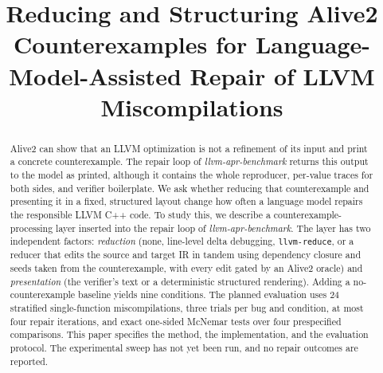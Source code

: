 \documentclass[conference]{IEEEtran}
\begin{document}
\title{Reducing and Structuring Alive2 Counterexamples for Language-Model-Assisted Repair of LLVM Miscompilations}

\author{%
\and
{}
\and
{}
\and
{}
}

\maketitle

\begin{abstract}
Alive2 can show that an LLVM optimization is not a refinement of its input and print a concrete counterexample. The repair loop of \emph{llvm-apr-benchmark} returns this output to the model as printed, although it contains the whole reproducer, per-value traces for both sides, and verifier boilerplate. We ask whether reducing that counterexample and presenting it in a fixed, structured layout change how often a language model repairs the responsible LLVM C++ code. To study this, we describe a counterexample-processing layer inserted into the repair loop of \emph{llvm-apr-benchmark}. The layer has two independent factors: \emph{reduction} (none, line-level delta debugging, \texttt{llvm-reduce}, or a reducer that edits the source and target IR in tandem using dependency closure and seeds taken from the counterexample, with every edit gated by an Alive2 oracle) and \emph{presentation} (the verifier's text or a deterministic structured rendering). Adding a no-counterexample baseline yields nine conditions. The planned evaluation uses 24 stratified single-function miscompilations, three trials per bug and condition, at most four repair iterations, and exact one-sided McNemar tests over four prespecified comparisons. This paper specifies the method, the implementation, and the evaluation protocol. The experimental sweep has not yet been run, and no repair outcomes are reported.
\end{abstract}
\end{document}
